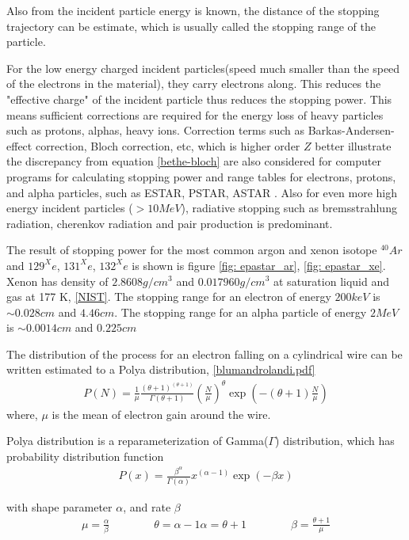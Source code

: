 Also from the incident particle energy is known, the distance of the stopping trajectory can be estimate, which is usually called the stopping range of the particle. 

For the low energy charged incident particles(speed much smaller than the speed of the  electrons in the material), they carry electrons along. This reduces the "effective charge" of the incident particle thus reduces the stopping power. This means sufficient corrections are required for the energy loss of heavy particles such as protons, alphas, heavy ions. Correction terms such as Barkas-Andersen-effect correction, Bloch correction, etc, which is higher order $Z$ better illustrate the discrepancy from equation \ref{bethe-bloch} are also considered for computer programs for calculating stopping power and range tables for electrons, protons, and alpha particles, such as ESTAR, PSTAR, ASTAR \cite{epastar}. Also for even more high energy incident particles ($>10 MeV$), radiative stopping such as bremsstrahlung radiation, cherenkov radiation and pair production is predominant.

The result of stopping power for the most common argon and xenon isotope $^40Ar$ and $129^Xe$, $131^Xe$, $132^Xe$ is shown is figure \ref{fig: epastar_ar}, \ref{fig: epastar_xe}. Xenon has density of $2.8608 g/cm^3$ and $0.017960 g/cm^3$ at saturation liquid and gas at 177 K, \ref{NIST}. The stopping range for an electron of energy $200 keV$ is $\sim 0.028 cm$ and $4.46 cm$. The stopping range for an alpha particle of energy $2 MeV$ is $\sim 0.0014 cm$ and $0.225 cm$

The distribution of the process for an electron falling on a cylindrical wire can be written estimated to a Polya distribution, \ref{blumandrolandi.pdf} 
\begin{align}
\label{polya}
P(N) = \frac{1}{\mu} \frac{(\theta+1)^(\theta+1)}{\Gamma(\theta+1)}(\frac{N}{\mu})^{\theta}\exp(-(\theta+1)\frac{N}{\mu})
\end{align}
where, $\mu$ is the mean of electron gain around the wire.

Polya distribution is a reparameterization of Gamma($\Gamma$) distribution, which has probability distribution function
\begin{align}
P(x) = \frac{\beta^{\alpha}}{\Gamma(\alpha)}x^(\alpha-1)\exp(-\beta x) 
\end{align}

with shape parameter $\alpha$, and rate $\beta$
\begin{align}
\mu = \frac{\alpha}{\beta}\quad\quad\quad\quad \theta =\alpha -1 
\alpha=  \theta+1 \quad\quad\quad\quad \beta = \frac{\theta+1}{\mu}
\end{align}
